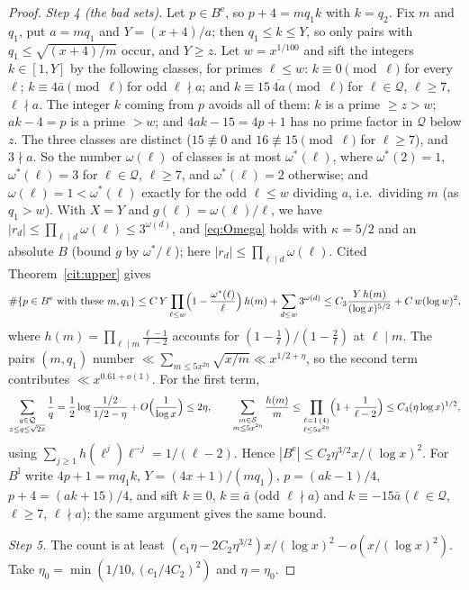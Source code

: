 \documentclass[11pt,reqno]{amsart}
\theoremstyle{definition}
\newcommand{\cS}{\mathcal S}
\newcommand{\cQ}{\mathcal Q}
\begin{document}
\begin{proof}
\emph{Step 4 (the bad sets).}  Let $p\in B^{\mathrm e}$, so
$p+4=mq_1k$ with $k=q_2$.  Fix $m$ and $q_1$, put $a=mq_1$ and
$Y=(x+4)/a$; then $q_1\le k\le Y$, so only pairs with
$q_1\le\sqrt{(x+4)/m}$ occur, and $Y\ge z$.  Let $w=x^{1/100}$ and sift
the integers $k\in[1,Y]$ by the following classes, for primes $\ell\le w$:
$k\equiv0\pmod\ell$ for every $\ell$; $k\equiv4\bar a\pmod\ell$ for odd
$\ell\nmid a$; and $k\equiv15\,\overline{4a}\pmod\ell$ for $\ell\in\cQ$,
$\ell\ge7$, $\ell\nmid a$.  The integer $k$ coming from $p$ avoids all of
them: $k$ is a prime $\ge z>w$; $ak-4=p$ is a prime $>w$; and
$4ak-15=4p+1$ has no prime factor in $\cQ$ below $z$.  The three classes
are distinct ($15\not\equiv0$ and $16\not\equiv15\pmod\ell$ for
$\ell\ge7$), and $3\nmid a$.  So the number $\omega(\ell)$ of classes is
at most $\omega^*(\ell)$, where $\omega^*(2)=1$, $\omega^*(\ell)=3$ for
$\ell\in\cQ$, $\ell\ge7$, and $\omega^*(\ell)=2$ otherwise; and
$\omega(\ell)=1<\omega^*(\ell)$ exactly for the odd $\ell\le w$ dividing
$a$, i.e.\ dividing $m$ (as $q_1>w$).  With $X=Y$ and
$g(\ell)=\omega(\ell)/\ell$, we have
$|r_d|\le\prod_{\ell\mid d}\omega(\ell)\le3^{\omega(d)}$, and
\eqref{eq:Omega} holds with $\kappa=5/2$ and an absolute $B$ (bound $g$ by
$\omega^*/\ell$); here $|r_d|\le\prod_{\ell\mid d}\omega(\ell)$.  Cited
Theorem~\ref{cit:upper} gives
\[
\#\{p\in B^{\mathrm e}\text{ with these }m,q_1\}\le C\,Y\prod_{\ell\le w}\Bigl(1-\frac{\omega^*(\ell)}\ell\Bigr)\,h(m)+\sum_{d\le w}3^{\omega(d)}
\le C_3\frac{Y\,h(m)}{(\log x)^{5/2}}+C\,w(\log w)^2,
\]
where $h(m)=\prod_{\ell\mid m}\frac{\ell-1}{\ell-2}$ accounts for
$(1-\frac1\ell)/(1-\frac2\ell)$ at $\ell\mid m$.  The pairs $(m,q_1)$
number $\ll\sum_{m\le5x^{2\eta}}\sqrt{x/m}\ll x^{1/2+\eta}$, so the second
term contributes $\ll x^{0.61+o(1)}$.  For the first term,
\[
\sum_{\substack{q\in\cQ\\ z\le q\le\sqrt{2x}}}\frac1q=\frac12\log\frac{1/2}{1/2-\eta}+O\Bigl(\frac1{\log x}\Bigr)\le2\eta,\qquad
\sum_{\substack{m\in\cS\\ m\le5x^{2\eta}}}\frac{h(m)}m\le\prod_{\substack{\ell\equiv1\,(4)\\ \ell\le5x^{2\eta}}}\Bigl(1+\frac1{\ell-2}\Bigr)\le C_4(\eta\log x)^{1/2},
\]
using $\sum_{j\ge1}h(\ell^j)\ell^{-j}=1/(\ell-2)$.  Hence
$|B^{\mathrm e}|\le C_2\eta^{3/2}x/(\log x)^2$.  For $B^{\mathrm l}$ write
$4p+1=mq_1k$, $Y=(4x+1)/(mq_1)$, $p=(ak-1)/4$, $p+4=(ak+15)/4$, and sift
$k\equiv0$, $k\equiv\bar a$ (odd $\ell\nmid a$) and $k\equiv-15\bar a$
($\ell\in\cQ$, $\ell\ge7$, $\ell\nmid a$); the same argument gives the same
bound.

\emph{Step 5.}  The count is at least
$(c_1\eta-2C_2\eta^{3/2})x/(\log x)^2-o(x/(\log x)^2)$.  Take
$\eta_0=\min(1/10,(c_1/4C_2)^2)$ and $\eta=\eta_0$.
\end{proof}
\end{document}
